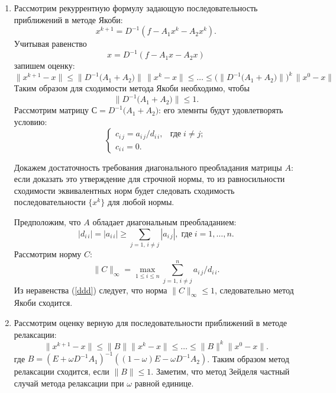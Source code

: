 \documentclass[12pt, a4paper]{article}
\newcommand{\norm}[1]{\lVert #1 \rVert}
\begin{document}
\begin{enumerate}
\begin{enumerate}
			\item Рассмотрим рекуррентную формулу задающую последовательность приближений в методе Якоби:
			\begin{equation}
				\label{eq:рекурентная-формула-якоби-КВ}
				x^{k+1} = D^{-1}(f - A_1 x^k - A_2 x^k ). 
			\end{equation}
			Учитывая равенство
			\[
			x = D^{-1}(f - A_1 x - A_2 x ) 
			\]
			запишем оценку:
			\[
			\norm{x^{k+1} - x} \le  \norm{D^{-1} \bigl(A_1 + A_2\bigr)} \, \norm{x^k - x} \le \ldots \le  \bigl(\norm{D^{-1}\bigl( A_1 + A_2\bigr)}\bigr)^k \, \norm{x^0 - x}
			\]
			Таким образом для сходимости метода Якоби необходимо, чтобы
			  \[
			  	\norm{D^{-1} \bigl(A_1 + A_2\bigr)} \le 1.
			  \]
			Рассмотрим матрицу $С = D^{-1} \bigl(A_1 + A_2\bigr)$: его элемнты будут удовлетворять условию:
			\[
			\begin{cases}
			c_{i \, j} = a_{i \, j} / d_{i \, i}, & \text{где} \; i \neq j; \\
			c_{i \, i} = 0.
			\end{cases}
			\]
			
			Докажем достаточность требования диагонального преобладания матрицы $A$: если доказать это утверждение для строчной нормы, то из равносильности сходимости эквивалентных норм будет следовать сходимость последовательности $\{x^k\}$ для любой нормы.
			
			Предположим, что $A$ обладает диагональным преобладанием:
			\begin{equation}
				\label{ddd}
				|d_{i \, i}| = |a_{i \, i}| \ge \sum_{j=1, \, i \neq j}|a_{i \, j}|, \; \text{где} \; i = 1,\ldots,n.
			\end{equation}
			Рассмотрим норму $C$:
			\[
			\norm{C}_\infty = \max_{1\le i\le n}\sum_{j=1, \, i \neq j}^{n} a_{i \, j} / d_{i \, i}.
			\]
			Из неравенства (\ref{ddd}) следует, что норма $\norm{C}_\infty \le 1$, следовательно метод Якоби сходится.
			
			\item Рассмотрим оценку верную для последовательности приближений в методе релаксации:
			\begin{equation}
				\label{eq:рекурентная-формула-релаксация-КВ}
				\norm{x^{k+1} - x} \le \norm{B}\norm{x^{k} - x} \le \ldots \le \norm{B}^k \norm{x^{0} - x}. 
			\end{equation}
			 где $B = (E + \omega D ^{-1}A_1)^{-1} ((1-\omega)E - \omega D ^{-1}A_2)$. Таким образом метод релаксации сходится, если $\norm{B}\le 1$. Заметим, что метод Зейделя частный случай метода релаксации при $\omega$ равной единице.
		\end{enumerate}
		


\end{enumerate}
\end{document}
